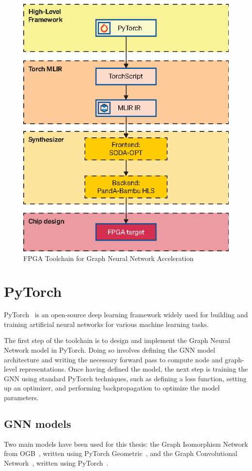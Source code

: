 \begin{figure}[t]
    \centering
    \includegraphics[height=0.6\textwidth]{Images/toolchain}
    \caption{FPGA Toolchain for Graph Neural Network Acceleration}
    \label{fig:toolchain}
\end{figure}

\section{PyTorch}
\label{sec:toolchain-pytorch}%

PyTorch~\cite{DBLP:journals/corr/abs-1912-01703} is an open-source deep learning framework widely used for building and training artificial neural networks for various machine learning tasks.

The first step of the toolchain is to design and implement the Graph Neural Network model in PyTorch.
Doing so involves defining the GNN model architecture and writing the necessary forward pass to compute node and graph-level representations.
Once having defined the model, the next step is training the GNN using standard PyTorch techniques, such as defining a loss function, setting up an optimizer, and performing backpropagation to optimize the model parameters.

\subsection{GNN models}
\label{subsec:gnn_models}%

Two main models have been used for this thesis: the Graph Isomorphism Network from OGB~\cite{NEURIPS2020_fb60d411, ogb_gnn_models}, written using PyTorch Geometric~\cite{DBLP:journals/corr/abs-1903-02428}, and the Graph Convolutional Network~\cite{DBLP:journals/corr/KipfW16, pygcn}, written using PyTorch~\cite{DBLP:journals/corr/abs-1912-01703}.

